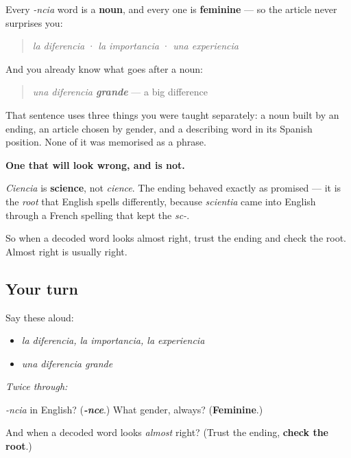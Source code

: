 \begin{grammarlens}[title={Grammar Lens: what you do with it}]
Every \emph{-ncia} word is a \textbf{noun}, and every one is \textbf{feminine} — so the article never surprises you:

\begin{quote}
\emph{la diferencia}  ·  \emph{la importancia}  ·  \emph{una experiencia}
\end{quote}

And you already know what goes after a noun:

\begin{quote}
\emph{una diferencia \textbf{grande}} — a big difference
\end{quote}

That sentence uses three things you were taught separately: a noun built by an ending, an article chosen by gender, and a describing word in its Spanish position. None of it was memorised as a phrase.
\end{grammarlens}

\begin{culture}
\textbf{One that will look wrong, and is not.}

\emph{Ciencia} is \textbf{science}, not \emph{cience}. The ending behaved exactly as promised — it is the \emph{root} that English spells differently, because \emph{scientia} came into English through a French spelling that kept the \emph{sc-}.

So when a decoded word looks almost right, trust the ending and check the root. Almost right is usually right.
\end{culture}

\subsection*{Your turn}
Say these aloud:

\begin{itemize}
\raggedright
  \item \emph{la diferencia, la importancia, la experiencia}
  \item \emph{una diferencia grande}
\end{itemize}

\emph{Twice through:}

\begin{tcolorbox}[breakable,colback=teal!4,colframe=teal!35!black,title={Before you move on}]
\emph{-ncia} in English? (\emph{\textbf{-nce}}.) What gender, always? (\textbf{Feminine}.)

And when a decoded word looks \emph{almost} right? (Trust the ending, \textbf{check the root}.)
\end{tcolorbox}
